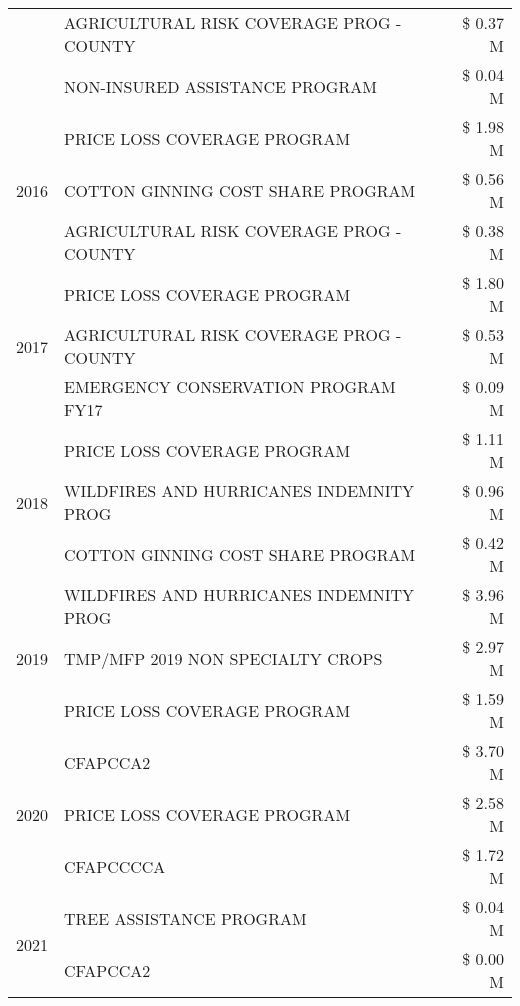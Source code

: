 \begin{tabular}{llr}
 & AGRICULTURAL RISK COVERAGE PROG - COUNTY & \$ 0.37 M \\
 & NON-INSURED ASSISTANCE PROGRAM & \$ 0.04 M \\
\cline{1-3}
\multirow[t]{3}{*}{2016} & PRICE LOSS COVERAGE PROGRAM                   & \$ 1.98 M \\
 & COTTON GINNING COST SHARE PROGRAM             & \$ 0.56 M \\
 & AGRICULTURAL RISK COVERAGE PROG - COUNTY      & \$ 0.38 M \\
\cline{1-3}
\multirow[t]{3}{*}{2017} & PRICE LOSS COVERAGE PROGRAM & \$ 1.80 M \\
 & AGRICULTURAL RISK COVERAGE PROG - COUNTY & \$ 0.53 M \\
 & EMERGENCY CONSERVATION PROGRAM FY17 & \$ 0.09 M \\
\cline{1-3}
\multirow[t]{3}{*}{2018} & PRICE LOSS COVERAGE PROGRAM & \$ 1.11 M \\
 & WILDFIRES AND HURRICANES INDEMNITY PROG & \$ 0.96 M \\
 & COTTON GINNING COST SHARE PROGRAM & \$ 0.42 M \\
\cline{1-3}
\multirow[t]{3}{*}{2019} & WILDFIRES AND HURRICANES INDEMNITY PROG & \$ 3.96 M \\
 & TMP/MFP 2019 NON SPECIALTY CROPS & \$ 2.97 M \\
 & PRICE LOSS COVERAGE PROGRAM & \$ 1.59 M \\
\cline{1-3}
\multirow[t]{3}{*}{2020} & CFAPCCA2 & \$ 3.70 M \\
 & PRICE LOSS COVERAGE PROGRAM & \$ 2.58 M \\
 & CFAPCCCCA & \$ 1.72 M \\
\cline{1-3}
\multirow[t]{2}{*}{2021} & TREE ASSISTANCE PROGRAM & \$ 0.04 M \\
 & CFAPCCA2 & \$ 0.00 M \\
\cline{1-3}
\bottomrule
\end{tabular}
